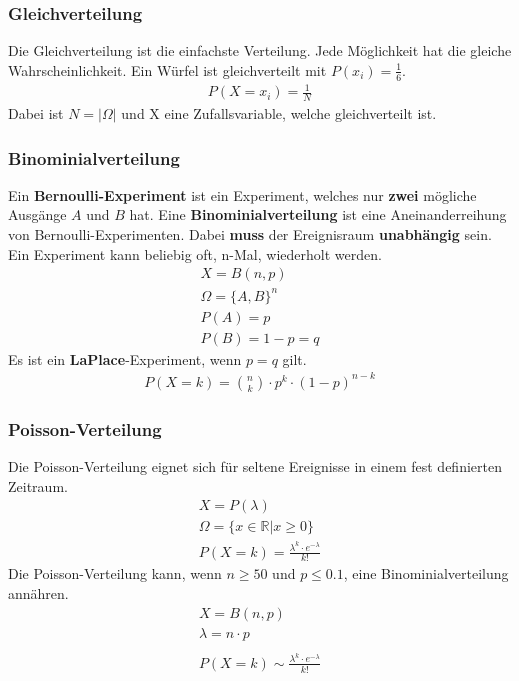 \documentclass[a4paper]{article}
\begin{document}
		\subsubsection{Gleichverteilung}	
			Die Gleichverteilung ist die einfachste Verteilung. Jede Möglichkeit hat die gleiche Wahrscheinlichkeit. Ein Würfel ist gleichverteilt mit $P(x_i) = \frac{1}{6}$.\\
			\begin{align*}
				P(X = x_i) = \frac{1}{N}
			\end{align*}
			Dabei ist $N = |\Omega|$ und X eine Zufallsvariable, welche gleichverteilt ist.
		\subsubsection{Binominialverteilung}
			Ein \textbf{Bernoulli-Experiment} ist ein Experiment, welches nur \textbf{zwei} mögliche Ausgänge $A$ und $B$ hat. Eine \textbf{Binominialverteilung} ist eine Aneinanderreihung von Bernoulli-Experimenten. Dabei \textbf{muss} der Ereignisraum \textbf{unabhängig} sein. Ein Experiment kann beliebig oft, n-Mal, wiederholt werden.
			\begin{align*}
				X = B(n, p)\\
				\Omega = \{A, B\}^n\\
				P(A) = p\\
				P(B) = 1 - p = q
			\end{align*}
			Es ist ein \textbf{LaPlace}-Experiment, wenn $p = q$ gilt.
			\begin{align*}
				P(X = k) = {n \choose k} \cdot p^k \cdot (1-p)^{n-k}
			\end{align*}
		\subsubsection{Poisson-Verteilung}
			Die Poisson-Verteilung eignet sich für seltene Ereignisse in einem fest definierten Zeitraum.
			\begin{align*}
				X = P(\lambda)\\
				\Omega = \{x \in \mathbb{R} | x \geq 0\}\\
				P(X = k) = \frac{\lambda^k \cdot e^{-\lambda}}{k!}	
			\end{align*}
			Die Poisson-Verteilung kann, wenn $n \ge 50$ und $p \leq 0.1$, eine Binominialverteilung annähren.
			\begin{align*}
				X = B(n, p) \\
				\lambda = n \cdot p \\\\
				 P(X = k) \sim \frac{\lambda^k \cdot e^{-\lambda}}{k!}	
			\end{align*}
\end{document}
